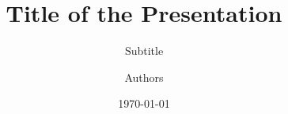 
\title[Title in head/foot]{Title of the Presentation}
\subtitle{Subtitle}
\author[Authors in head/foot]{Authors}
\date[\today]{\today}
